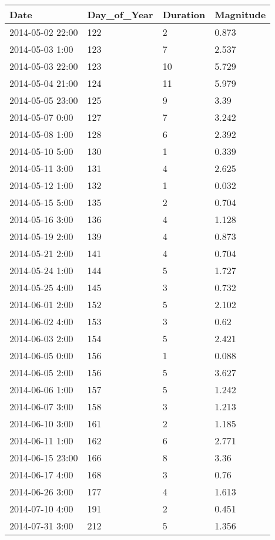 \documentclass[
]{article}
\begin{document}
\begin{tabular}{l|l|l|l}
\hline
Date & Day\_of\_Year & Duration & Magnitude\\
\hline
2014-05-02 22:00 & 122 & 2 & 0.873\\
\hline
2014-05-03 1:00 & 123 & 7 & 2.537\\
\hline
2014-05-03 22:00 & 123 & 10 & 5.729\\
\hline
2014-05-04 21:00 & 124 & 11 & 5.979\\
\hline
2014-05-05 23:00 & 125 & 9 & 3.39\\
\hline
2014-05-07 0:00 & 127 & 7 & 3.242\\
\hline
2014-05-08 1:00 & 128 & 6 & 2.392\\
\hline
2014-05-10 5:00 & 130 & 1 & 0.339\\
\hline
2014-05-11 3:00 & 131 & 4 & 2.625\\
\hline
2014-05-12 1:00 & 132 & 1 & 0.032\\
\hline
2014-05-15 5:00 & 135 & 2 & 0.704\\
\hline
2014-05-16 3:00 & 136 & 4 & 1.128\\
\hline
2014-05-19 2:00 & 139 & 4 & 0.873\\
\hline
2014-05-21 2:00 & 141 & 4 & 0.704\\
\hline
2014-05-24 1:00 & 144 & 5 & 1.727\\
\hline
2014-05-25 4:00 & 145 & 3 & 0.732\\
\hline
2014-06-01 2:00 & 152 & 5 & 2.102\\
\hline
2014-06-02 4:00 & 153 & 3 & 0.62\\
\hline
2014-06-03 2:00 & 154 & 5 & 2.421\\
\hline
2014-06-05 0:00 & 156 & 1 & 0.088\\
\hline
2014-06-05 2:00 & 156 & 5 & 3.627\\
\hline
2014-06-06 1:00 & 157 & 5 & 1.242\\
\hline
2014-06-07 3:00 & 158 & 3 & 1.213\\
\hline
2014-06-10 3:00 & 161 & 2 & 1.185\\
\hline
2014-06-11 1:00 & 162 & 6 & 2.771\\
\hline
2014-06-15 23:00 & 166 & 8 & 3.36\\
\hline
2014-06-17 4:00 & 168 & 3 & 0.76\\
\hline
2014-06-26 3:00 & 177 & 4 & 1.613\\
\hline
2014-07-10 4:00 & 191 & 2 & 0.451\\
\hline
2014-07-31 3:00 & 212 & 5 & 1.356\\

\end{tabular}
\end{document}
